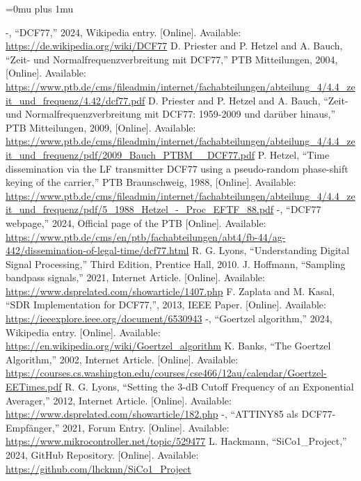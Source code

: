 \documentclass[conference]{IEEEtran}
\begin{document}
\Urlmuskip=0mu plus 1mu
\begin{thebibliography}{00}
 -, ``DCF77,'' 2024, Wikipedia entry. [Online]. Available: \url{https://de.wikipedia.org/wiki/DCF77}
 D. Priester and P. Hetzel and A. Bauch, ``Zeit- und Normalfrequenzverbreitung mit DCF77,'' PTB Mitteilungen, 2004, [Online]. Available: \url{https://www.ptb.de/cms/fileadmin/internet/fachabteilungen/abteilung_4/4.4_zeit_und_frequenz/4.42/dcf77.pdf}
 D. Priester and P. Hetzel and A. Bauch, ``Zeit- und Normalfrequenzverbreitung mit DCF77: 1959-2009 und darüber hinaus,'' PTB Mitteilungen, 2009, [Online]. Available: \url{https://www.ptb.de/cms/fileadmin/internet/fachabteilungen/abteilung_4/4.4_zeit_und_frequenz/pdf/2009_Bauch_PTBM__DCF77.pdf}
 P. Hetzel, ``Time dissemination via the LF transmitter DCF77 using a pseudo-random phase-shift keying of the carrier,'' PTB Braunschweig, 1988, [Online]. Available: \url{https://www.ptb.de/cms/fileadmin/internet/fachabteilungen/abteilung_4/4.4_zeit_und_frequenz/pdf/5_1988_Hetzel_-_Proc_EFTF_88.pdf}
 -, ``DCF77 webpage,'' 2024, Official page of the PTB [Online]. Available: \url{https://www.ptb.de/cms/en/ptb/fachabteilungen/abt4/fb-44/ag-442/dissemination-of-legal-time/dcf77.html}
 R. G. Lyons, ``Understanding Digital Signal Processing,'' Third Edition, Prentice Hall, 2010.
 J. Hoffmann, ``Sampling bandpass signals,'' 2021, Internet Article. [Online]. Available: \url{https://www.dsprelated.com/showarticle/1407.php}
 F. Zaplata and M. Kasal, ``SDR Implementation for DCF77,'', 2013, IEEE Paper. [Online]. Available: \url{https://ieeexplore.ieee.org/document/6530943}
 -, ``Goertzel algorithm,'' 2024, Wikipedia entry. [Online]. Available: \url{https://en.wikipedia.org/wiki/Goertzel_algorithm}
 K. Banks, ``The Goertzel Algorithm,'' 2002, Internet Article. [Online]. Available: \url{https://courses.cs.washington.edu/courses/cse466/12au/calendar/Goertzel-EETimes.pdf}
 R. G. Lyons, ``Setting the 3-dB Cutoff Frequency of an Exponential Averager,'' 2012, Internet Article. [Online]. Available: \url{https://www.dsprelated.com/showarticle/182.php}
 -, ``ATTINY85 als DCF77-Empfänger,'' 2021, Forum Entry. [Online]. Available: \url{https://www.mikrocontroller.net/topic/529477}
 L. Hackmann, ``SiCo1\_Project,'' 2024, GitHub Repository. [Online]. Available: \url{https://github.com/lhckmn/SiCo1_Project}
\end{thebibliography}
\end{document}
